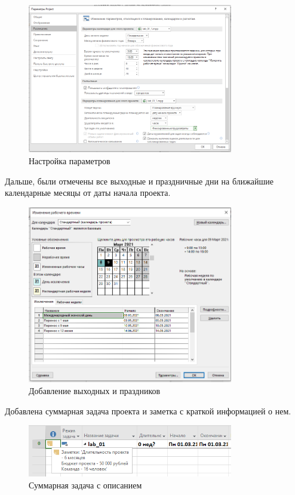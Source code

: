 \begin{figure}[H]
	\centering
	\includegraphics[width=0.8\textwidth]{img/content/settings.png}
	\caption{Настройка параметров}
\end{figure}

Дальше, были отмечены все выходные и праздничные дни на ближайшие календарные месяцы от даты начала проекта.

\begin{figure}[H]
	\centering
	\includegraphics[width=0.8\textwidth]{img/content/calendar.png}
	\caption{Добавление выходных и праздников}
\end{figure}

Добавлена суммарная задача проекта и заметка с краткой информацией о нем.

\begin{figure}[H]
	\centering
	\includegraphics[width=0.8\textwidth]{img/content/summary.png}
	\caption{Суммарная задача с описанием}
\end{figure}


